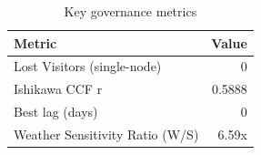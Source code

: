 \begin{table}[htbp]
\centering
\caption{Key governance metrics}
\label{tab:key_metrics}
\begin{tabular}{lr}
\toprule
Metric & Value \\
\midrule
  Lost Visitors (single-node) & 0 \\
  Ishikawa CCF r & 0.5888 \\
  Best lag (days) & 0 \\
  Weather Sensitivity Ratio (W/S) & 6.59x \\
\bottomrule
\end{tabular}
\end{table}